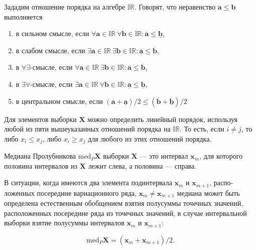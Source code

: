 \documentclass{article}
\begin{document}
  Зададим отношение порядка на алгебре \( \mathbb{IR} \). Говорят, что
  неравенство \( \mathbf{a} \leqslant \mathbf{b} \) выполняется

  \begin{enumerate}
    \item в сильном смысле, если
      \( \forall \mathbf{a} \in \mathbb{IR} \ \forall \mathbf{b} \in \mathbb{IR}: \overline{\mathbf{a}} \leqslant \underline{\mathbf{b}} \),
    \item в слабом смысле, если
      \( \exists \mathbf{a} \in \mathbb{IR} \ \exists \mathbf{b} \in \mathbb{IR}: \underline{\mathbf{a}} \leqslant \overline{\mathbf{b}} \),
    \item в \( \forall \exists \)-смысле, если
      \( \forall \mathbf{a} \in \mathbb{IR} \ \exists \mathbf{b} \in \mathbb{IR}: \overline{\mathbf{a}} \leqslant \overline{\mathbf{b}} \),
    \item в \( \exists \forall \)-смысле, если
      \( \exists \mathbf{a} \in \mathbb{IR} \ \forall \mathbf{b} \in \mathbb{IR}: \underline{\mathbf{a}} \leqslant \underline{\mathbf{b}} \),
    \item в центральном смысле, если
      \( (\overline{\mathbf{a}} + \underline{\mathbf{a}}) / 2 \leqslant (\overline{\mathbf{b}} + \underline{\mathbf{b}}) / 2 \)
  \end{enumerate}

  Для элементов выборки \( \mathbf{X} \) можно определить линейный порядок,
  используя любой из пяти вышеуказанных отношений порядка на
  \( \mathbb{IR} \). То есть, если \( i \ne j \), то либо
  \( x_i \leqslant x_j \), либо \( x_i \geqslant x_j \) для любого из
  этих отношений порядка.

  Медиана Пролубникова \( \text{med}_P \mathbf{X} \) выборки
  \( \mathbf{X} \) --- это интервал \( \mathbf{x}_m \), для которого
  половина интервалов из \( \mathbf{X} \) лежит слева, а половина
  --- справа.

  В ситуации, когда имеются два элемента подинтервала \( \mathbf{x}_m \)
  и \( \mathbf{x}_{m+1} \), распо­ложенных посередине вариационного ряда,
  \( \mathbf{x}_m \ne \mathbf{x}_{m+1} \) медиана может быть определена
  естественным обобщением взятия полусуммы точечных значений,
  расположенных посередине ряда из точечных значений, в случае
  интервальной выборки взятие полусуммы интервалов \( \mathbf{x}_m \)
  и \( \mathbf{x}_{m+1} \):

  \begin{equation}
    \text{med}_P \mathbf{X} = (\mathbf{x}_m + \mathbf{x}_{m+1}) / 2.
  \end{equation}
\end{document}
